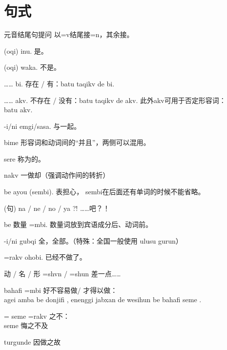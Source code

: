 \pagebreak

\section{句式}

\begin{des}
    \item[元音结尾句提问] 以=v结尾接=n，其余接。
    \item[\A (oqi) \B inu.] 是。
    \item[\A (oqi) \B waka.] 不是。
    \item[…… bi.] 存在 / 有：batu taqikv de bi.
    \item[…… akv.] 不存在 / 没有：batu taqikv de akv. 此外akv可用于否定形容词：\\
        batu    akv.
    \item[\A \B -i/ni emgi/sasa.] \A 与\B 一起。
    \item[\lat{adj./v.} bime \lat{adj./v.}]  形容词和动词间的“并且”，两侧可以混用。
    \item[\A sere \B ] 称为\A 的\B 。
    \item[\V\ftn{命} nakv] 一做\V 却（强调动作间的转折）
    \item[\A \B be \V\ftn{结句} ayou (sembi).] 表担心， sembi在后面还有单词的时候不能省略。
    \item[(句) na / ne / no / ya ?!] ……吧？！ 

    \item[\A \B be 数量 \V=mbi.]数量词放到宾语成分后、动词前。 
    \item[\A -i/ni gubqi] 全\A ，全部\A 。（特殊：全国一般使用 ulusu gurun） 

    \item[\V=rakv ohobi.] 已经不做\V 了。
    \item[动 / 名 / 形 =shvn / =shun] 差一点……
    \item[bahafi \V=mbi] 好不容易做\V / 才得以做\V ：\\
        agei amba  be donjifi , enenggi jabxan de wesihun  be bahafi    seme .
    \item[\V=\ii{=ha}{=he}{=ho} seme \V=rakv] \V 之不\V ：\\
         seme  悔之不及 
    \item[\V\ftn{形} turgunde] 因做\V 之故


\end{des}
